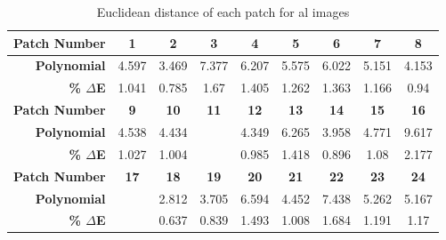 \begin{table}[H]
  \caption{Euclidean distance of each patch for al images }
  \begin{center}
    \begin{tabularx}{\textwidth}{r c c c c c c c c}
    \toprule
        \textbf{Patch Number} & \textbf{1} & \textbf{2} & \textbf{3} & \textbf{4} & \textbf{5} & \textbf{6} & \textbf{7} & \textbf{8}\\ \midrule 
        \textbf{Polynomial} &4.597 &3.469 &7.377 &6.207 &5.575 &6.022 &5.151 &4.153\\ 
        \textbf{\textbf{\% $\Delta$E}} &1.041 &0.785 &1.67 &1.405 &1.262 &1.363 &1.166 &0.94\\ \midrule 
        \textbf{Patch Number} & \textbf{9} & \textbf{10} & \textbf{11} & \textbf{12} & \textbf{13} & \textbf{14} & \textbf{15} & \textbf{16}\\ \midrule 
        \textbf{Polynomial} &4.538 &4.434 &\cellcolor{colorred}{12.564} &4.349 &6.265 &3.958 &4.771 &9.617\\ 
        \textbf{\textbf{\% $\Delta$E}} &1.027 &1.004 &\cellcolor{colorred}{2.845} &0.985 &1.418 &0.896 &1.08 &2.177\\ \midrule 
        \textbf{Patch Number} & \textbf{17} & \textbf{18} & \textbf{19} & \textbf{20} & \textbf{21} & \textbf{22} & \textbf{23} & \textbf{24}\\ \midrule 
        \textbf{Polynomial} &\cellcolor{colorgreen}{2.576} &2.812 &3.705 &6.594 &4.452 &7.438 &5.262 &5.167\\ 
        \textbf{\textbf{\% $\Delta$E}} &\cellcolor{colorgreen}{0.583} &0.637 &0.839 &1.493 &1.008 &1.684 &1.191 &1.17\\ \midrule 
    \bottomrule
    \end{tabularx}
  \end{center}
\end{table}
